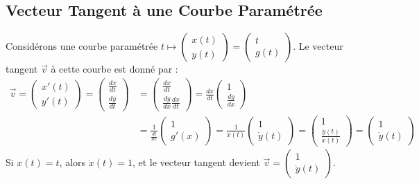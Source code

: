 \documentclass[oneside]{book}
\begin{document}
\subsection{Vecteur Tangent à une Courbe Paramétrée}

Considérons une courbe paramétrée $t \mapsto \begin{pmatrix} x(t) \\ y(t) \end{pmatrix} = \begin{pmatrix} t \\ g(t) \end{pmatrix}$. Le vecteur tangent $\vec{v}$ à cette courbe est donné par :
\begin{align*}
\vec{v} = \begin{pmatrix} x'(t) \\ y'(t) \end{pmatrix} = \begin{pmatrix} \frac{dx}{dt} \\ \frac{dy}{dt} \end{pmatrix} &= \begin{pmatrix} \frac{dx}{dt} \\ \frac{dy}{dx} \frac{dx}{dt} \end{pmatrix} = \frac{dx}{dt} \begin{pmatrix} 1 \\ \frac{dy}{dx} \end{pmatrix} \\
&= \frac{1}{\frac{dt}{dx}} \begin{pmatrix} 1 \\ g'(x) \end{pmatrix} = \frac{1}{\dot{x}(t)} \begin{pmatrix} 1 \\ \dot{y}(t) \end{pmatrix} = \begin{pmatrix} 1 \\ \frac{\dot{y}(t)}{\dot{x}(t)} \end{pmatrix} =  \begin{pmatrix} 1 \\ \dot{y}(t) \end{pmatrix}
\end{align*}
Si $x(t) = t$, alors $\dot{x}(t) = 1$, et le vecteur tangent devient $\vec{v} = \begin{pmatrix} 1 \\ \dot{y}(t) \end{pmatrix}$.
\end{document}
